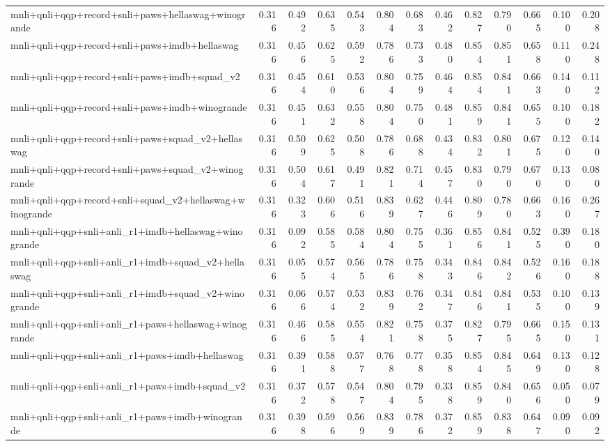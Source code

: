 \begin{table}[t]
\begin{tabular}{lrrrrrrrrrrrr}
    mnli+qnli+qqp+record+snli+paws+hellaswag+winogrande & 0.316 & 0.492 & 0.635 & 0.543 & 0.804 & 0.683 & 0.462 & 0.827 & 0.790 & 0.665 & 0.100 & 0.208 \\
    mnli+qnli+qqp+record+snli+paws+imdb+hellaswag & 0.316 & 0.456 & 0.625 & 0.592 & 0.786 & 0.733 & 0.480 & 0.854 & 0.851 & 0.658 & 0.110 & 0.248 \\
    mnli+qnli+qqp+record+snli+paws+imdb+squad\_v2 & 0.316 & 0.454 & 0.610 & 0.536 & 0.804 & 0.759 & 0.464 & 0.854 & 0.841 & 0.663 & 0.140 & 0.112 \\
    mnli+qnli+qqp+record+snli+paws+imdb+winogrande & 0.316 & 0.451 & 0.632 & 0.558 & 0.804 & 0.750 & 0.481 & 0.859 & 0.841 & 0.655 & 0.100 & 0.182 \\
    mnli+qnli+qqp+record+snli+paws+squad\_v2+hellaswag & 0.316 & 0.509 & 0.625 & 0.508 & 0.786 & 0.688 & 0.434 & 0.832 & 0.801 & 0.675 & 0.120 & 0.140 \\
    mnli+qnli+qqp+record+snli+paws+squad\_v2+winogrande & 0.316 & 0.504 & 0.617 & 0.491 & 0.821 & 0.714 & 0.457 & 0.830 & 0.790 & 0.670 & 0.130 & 0.080 \\
    mnli+qnli+qqp+record+snli+squad\_v2+hellaswag+winogrande & 0.316 & 0.323 & 0.606 & 0.516 & 0.839 & 0.627 & 0.446 & 0.809 & 0.780 & 0.663 & 0.160 & 0.267 \\
    mnli+qnli+qqp+snli+anli\_r1+imdb+hellaswag+winogrande & 0.316 & 0.092 & 0.585 & 0.584 & 0.804 & 0.755 & 0.361 & 0.856 & 0.841 & 0.525 & 0.390 & 0.180 \\
    mnli+qnli+qqp+snli+anli\_r1+imdb+squad\_v2+hellaswag & 0.316 & 0.055 & 0.574 & 0.565 & 0.786 & 0.758 & 0.343 & 0.846 & 0.842 & 0.526 & 0.160 & 0.188 \\
    mnli+qnli+qqp+snli+anli\_r1+imdb+squad\_v2+winogrande & 0.316 & 0.066 & 0.574 & 0.532 & 0.839 & 0.762 & 0.347 & 0.846 & 0.841 & 0.535 & 0.100 & 0.139 \\
    mnli+qnli+qqp+snli+anli\_r1+paws+hellaswag+winogrande & 0.316 & 0.466 & 0.585 & 0.554 & 0.821 & 0.758 & 0.375 & 0.827 & 0.795 & 0.665 & 0.150 & 0.131 \\
    mnli+qnli+qqp+snli+anli\_r1+paws+imdb+hellaswag & 0.316 & 0.391 & 0.588 & 0.577 & 0.768 & 0.778 & 0.358 & 0.854 & 0.845 & 0.649 & 0.130 & 0.128 \\
    mnli+qnli+qqp+snli+anli\_r1+paws+imdb+squad\_v2 & 0.316 & 0.372 & 0.578 & 0.547 & 0.804 & 0.795 & 0.338 & 0.859 & 0.840 & 0.656 & 0.050 & 0.079 \\
    mnli+qnli+qqp+snli+anli\_r1+paws+imdb+winogrande & 0.316 & 0.398 & 0.596 & 0.569 & 0.839 & 0.786 & 0.372 & 0.859 & 0.838 & 0.647 & 0.090 & 0.092 \\

\end{tabular}
\end{table}
